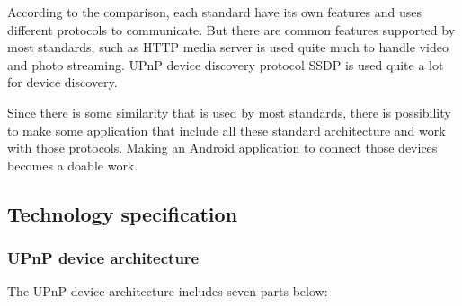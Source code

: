 
According to the comparison, each standard have its own features and uses different protocols 
to communicate. But there are common features supported by most standards, such as HTTP media 
server is used quite much to handle video and photo streaming. UPnP device discovery protocol 
SSDP is used quite a lot for device discovery. 

Since there is some similarity that is used by most standards, there is possibility to make 
some application that include all these standard architecture and work with those protocols. 
Making an Android application to connect those devices becomes a doable work.

\subsection*{Technology specification}
\subsubsection*{UPnP device architecture}
The UPnP device architecture \cite{upnp} \label{upnp} includes seven parts
below:

